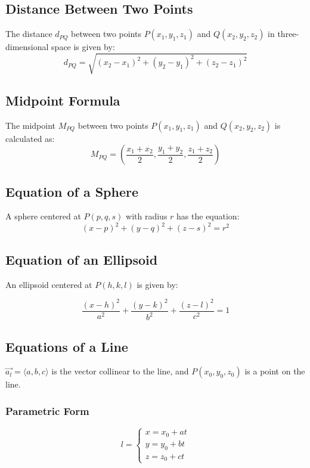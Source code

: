 \documentclass[a4paper,12pt,openany]{book}
\begin{document}
\subsection{Distance Between Two Points}

The distance \(d_{PQ}\) between two points \( P(x_1, y_1, z_1) \) and \( Q(x_2, y_2, z_2) \) in three-dimensional space is given by:
\begin{equation}
    d_{PQ} = \sqrt{(x_2 - x_1)^2 + (y_2 - y_1)^2 + (z_2 - z_1)^2}
\end{equation}

\subsection{Midpoint Formula}

The midpoint \(M_{PQ}\) between two points \( P(x_1, y_1, z_1) \) and \( Q(x_2, y_2, z_2) \) is calculated as:
\begin{equation}
    M_{PQ} = \left(\dfrac{x_1 + x_2}{2}, \dfrac{y_1 + y_2}{2}, \dfrac{z_1 + z_2}{2}\right)
\end{equation}

\subsection{Equation of a Sphere}

A sphere centered at \(P(p, q, s)\) with radius \( r \) has the equation:
\begin{equation}
    (x - p)^2 + (y - q)^2 + (z - s)^2 = r^2
\end{equation}

\subsection{Equation of an Ellipsoid}

An ellipsoid centered at \(P(h, k, l)\) is given by:

\begin{equation}
    \dfrac{(x-h)^2}{a^2} +  
    \dfrac{(y-k)^2}{b^2} + 
    \dfrac{(z-l)^2}{c^2} = 1
\end{equation}

\subsection{Equations of a Line}
\(\vec{a_l} = \langle a, b, c \rangle\) is the vector collinear to the line, and \(P(x_0, y_0, z_0)\) is a point on the line.
\subsubsection{Parametric Form}
\begin{equation}
    l = 
    \begin{cases}
        x = x_0 + at\\
        y = y_0 + bt\\
        z = z_0 + ct
    \end{cases}
\end{equation}
\end{document}

